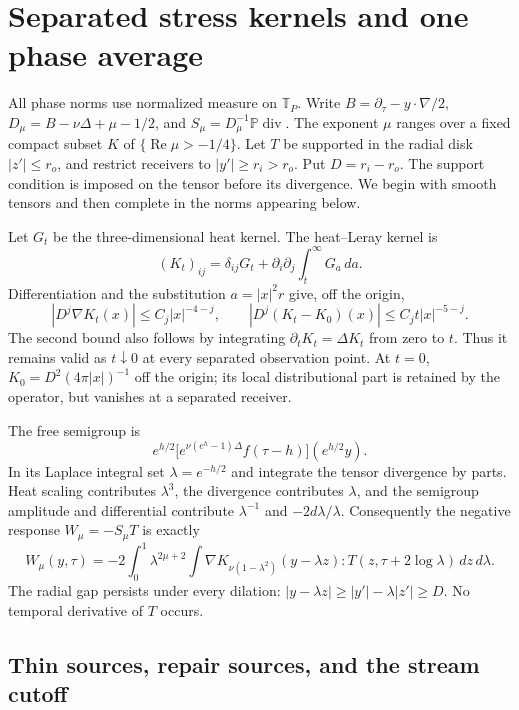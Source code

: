 \section{Separated stress kernels and one phase average}
\label{sec:separated-short}

All phase norms use normalized measure on $\mathbb T_P$.
Write $B=\partial_\tau-y\cdot\nabla/2$,
$D_\mu=B-\nu\Delta+\mu-1/2$, and
$S_\mu=D_\mu^{-1}\mathbb P\operatorname{div}$.
The exponent $\mu$ ranges over a fixed compact subset $K$ of
$\{\operatorname{Re}\mu>-1/4\}$. Let $T$ be supported in the
radial disk $|z'|\le r_o$, and restrict receivers to $|y'|\ge r_i>r_o$.
Put $D=r_i-r_o$. The support condition is imposed on the tensor before
its divergence. We begin with smooth tensors and then complete in the
norms appearing below.

Let $G_t$ be the three-dimensional heat kernel. The heat--Leray kernel is
\[
 (K_t)_{ij}=\delta_{ij}G_t+
   \partial_i\partial_j\int_t^\infty G_a\,da.
\]
Differentiation and the substitution $a=|x|^2r$ give, off the origin,
\begin{equation}\label{sep:kernel}
 |D^j\nabla K_t(x)|\le C_j|x|^{-4-j},\qquad
 |D^j(K_t-K_0)(x)|\le C_jt|x|^{-5-j}.
\end{equation}
The second bound also follows by integrating
$\partial_tK_t=\Delta K_t$ from zero to $t$. Thus it remains valid
as $t\downarrow0$ at every separated observation point. At $t=0$,
$K_0=D^2(4\pi|x|)^{-1}$ off the origin; its local distributional
part is retained by the operator, but vanishes at a separated receiver.

The free semigroup is
\[
 e^{h/2}\bigl[e^{\nu(e^h-1)\Delta}f(\tau-h)\bigr](e^{h/2}y).
\]
In its Laplace integral set $\lambda=e^{-h/2}$ and integrate the
tensor divergence by parts. Heat scaling contributes $\lambda^3$,
the divergence contributes $\lambda$, and the semigroup amplitude
and differential contribute $\lambda^{-1}$ and $-2d\lambda/\lambda$.
Consequently the negative response $W_\mu=-S_\mu T$ is exactly
\begin{equation}\label{sep:resolvent}
 W_\mu(y,\tau)=-2\int_0^1\lambda^{2\mu+2}
  \int\nabla K_{\nu(1-\lambda^2)}(y-\lambda z)
       :T(z,\tau+2\log\lambda)\,dz\,d\lambda.
\end{equation}
The radial gap persists under every dilation:
$|y-\lambda z|\ge |y'|-\lambda|z'|\ge D$.
No temporal derivative of $T$ occurs.

\subsection{Thin sources, repair sources, and the stream cutoff}

